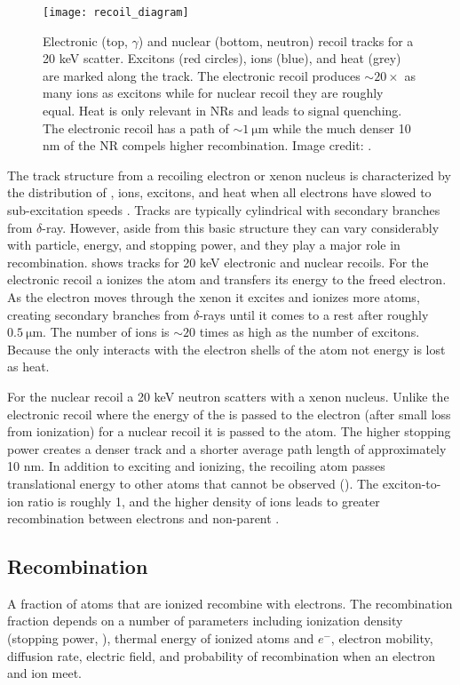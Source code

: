 \begin{figure}
\centering
\texttt{[image: recoil\_diagram]}
\caption{Electronic (top, $\gamma$) and nuclear (bottom, neutron) recoil tracks for a 20 keV scatter.  Excitons (red circles), ions
(blue), and
heat (grey) are marked along the track.  The electronic recoil produces ${\sim} 20 \times$ as many ions as excitons while for nuclear
recoil they are roughly equal.  Heat is only relevant in NRs and leads to signal quenching.  The electronic recoil has a path of
${\sim} 1\ \mathrm{\mu m}$ while the much denser 10 nm of the NR compels higher recombination.  Image credit: .}
\label{fig:er_nr_recoil_diagram}
\end{figure}

The track structure from a recoiling electron or xenon nucleus is characterized by the distribution of \electron, ions, excitons, and heat
when all electrons have slowed to sub-excitation speeds .  Tracks are typically cylindrical with secondary branches
from $\delta$-ray.  However, aside from this basic structure they can vary considerably with particle, energy, and
stopping power, and they play a major role in recombination.   shows tracks for 20 keV electronic and
nuclear
recoils.  For the electronic recoil a \gammaray ionizes the atom and transfers its energy to the freed electron.  As the electron moves
through the xenon it excites and ionizes more atoms, creating secondary branches from $\delta$-rays until it comes to a rest after
roughly $0.5\ \mathrm{\mu m}$.  The number of ions is ${\sim}20$ times as high as the number of excitons.  Because the \electron only
interacts with the electron shells of the atom not energy is lost as heat.

For the nuclear recoil a 20 keV neutron scatters with a xenon nucleus.  Unlike the electronic recoil where the energy of the \gammaray is
passed to the electron (after small loss from ionization) for a nuclear recoil it is passed to the atom.  The higher stopping power
creates a denser track and a shorter average path length of approximately 10 nm.  In addition to exciting and ionizing, the recoiling atom
passes translational energy to other atoms that cannot be observed ().  The exciton-to-ion ratio is roughly
1, and the higher density of ions leads to greater recombination between electrons and non-parent .


\subsection{Recombination}
\label{subsec:recombination}
A fraction of atoms that are ionized recombine with electrons.  The recombination fraction depends on a number of parameters
including ionization density
(stopping power, ), thermal energy of ionized atoms and $e^{-}$, electron mobility, diffusion rate, electric
field, and probability of recombination when an electron and ion meet.

